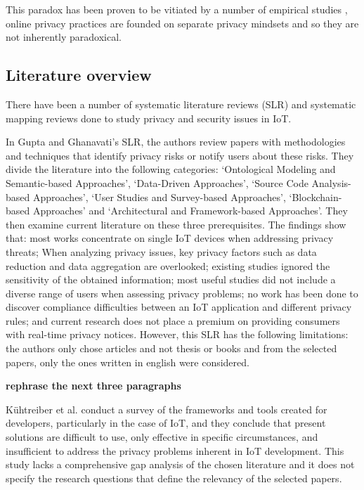 \documentclass[conference]{IEEEtran}
\begin{document}
This paradox has been proven to be vitiated by a number of empirical studies \cite{dienlin2015privacy, xie2019consumers, SCHWAIG20131, sannon2018privacy},
online privacy practices are founded on separate privacy mindsets and so they are not inherently paradoxical.

\subsection{Literature overview}

There have been a number of systematic literature reviews (SLR) \cite{Gupta2022Privacy, Kuhtreiber2022survey, sicari2015security, LinSurvey}
and systematic mapping reviews \cite{porras2018security, ahmed2019aspects}
done to study privacy and security issues in IoT.

In Gupta and Ghanavati's \cite{Gupta2022Privacy} SLR,
the authors review papers with methodologies and techniques that identify
privacy risks or notify users about these risks. They divide the literature
into the following categories: `Ontological Modeling and Semantic-based Approaches',
`Data-Driven Approaches', `Source Code Analysis-based Approaches', `User Studies
and Survey-based Approaches', `Blockchain-based Approaches' and `Architectural
and Framework-based Approaches'. They then examine current literature
on these three prerequisites. The findings show that: most works concentrate
on single IoT devices when addressing privacy threats; When analyzing
privacy issues, key privacy factors such as data reduction and data
aggregation are overlooked; existing studies ignored the sensitivity of
the obtained information; most useful studies did not include a diverse
range of users when assessing privacy problems; no work has been done to
discover compliance difficulties between an IoT application and different
privacy rules; and current research does not place a premium on providing
consumers with real-time privacy notices. However, this SLR has the following
limitations: the authors only chose articles and not thesis or books and
from the selected papers, only the ones written in english were considered.

\textbf{\color{red}rephrase the next three paragraphs}

Kühtreiber et al. \cite{Kuhtreiber2022survey} conduct a survey of the
frameworks and tools created for developers, particularly in the case of IoT,
and they conclude that present solutions are difficult to use, only
effective in specific circumstances, and insufficient to address the
privacy problems inherent in IoT development. This study lacks a comprehensive
gap analysis of the chosen literature and it does not specify the research
questions that define the relevancy of the selected papers.
\end{document}
